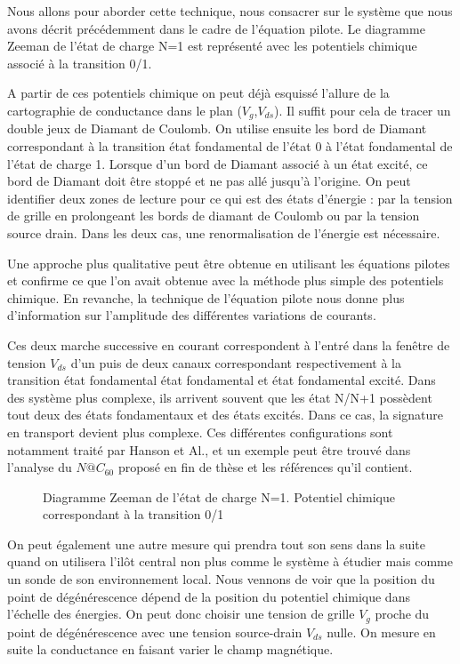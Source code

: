 Nous allons pour aborder cette technique, nous consacrer sur le système que nous avons décrit précédemment dans le cadre de l'équation pilote. Le diagramme Zeeman de l'état de charge N=1 est représenté avec les potentiels chimique associé à la transition 0/1.

A partir de ces potentiels chimique on peut déjà esquissé l'allure de la cartographie de conductance dans le plan ($V_g$,$V_{ds}$). Il suffit pour cela de tracer un double jeux de Diamant de Coulomb. On utilise ensuite les bord de Diamant correspondant à la transition état fondamental de l'état 0 à l'état fondamental de l'état de charge 1. Lorsque d'un bord de Diamant associé à un état excité, ce bord de Diamant doit \^etre stoppé et ne pas allé jusqu'à l'origine. On peut identifier deux zones de lecture pour ce qui est des états d'énergie : par la tension de grille en prolongeant les bords de diamant de Coulomb ou par la tension source drain. Dans les deux cas, une renormalisation de l'énergie est nécessaire.

Une approche plus qualitative peut \^etre obtenue en utilisant les équations pilotes et confirme ce que l'on avait obtenue avec la méthode plus simple des potentiels chimique. En revanche, la technique de l'équation pilote nous donne plus d'information sur l'amplitude des différentes variations de courants.

Ces deux marche successive en courant correspondent à l'entré dans la fen\^etre de tension $V_{ds}$ d'un puis de deux canaux correspondant respectivement à la transition état fondamental état fondamental et état fondamental excité. Dans des système plus complexe, ils arrivent souvent que les état N/N+1 possèdent tout deux des états fondamentaux et des états excités. Dans ce cas, la signature en transport devient plus complexe. Ces différentes configurations sont notamment traité par Hanson et Al., et un exemple peut \^etre trouvé dans l'analyse du $N@C_{60}$ proposé en fin de thèse et les références qu'il contient.

\begin{figure}
\caption{Diagramme Zeeman de l'état de charge N=1. Potentiel chimique correspondant à la transition 0/1}
\label{charge_discharge}
\end{figure}

On peut également une autre mesure qui prendra tout son sens dans la suite quand on utilisera l'il\^ot central non plus comme le système à étudier mais comme un sonde de son environnement local. Nous vennons de voir que la position du point de dégénérescence dépend de la position du potentiel chimique dans l'échelle des énergies. On peut donc choisir une tension de grille $V_g$ proche du point de dégénérescence avec une tension source-drain $V_{ds}$ nulle. On mesure en suite la conductance en faisant varier le champ magnétique.